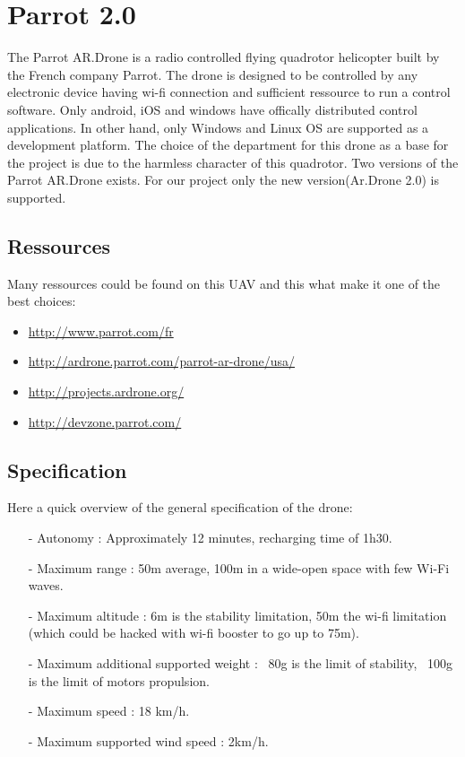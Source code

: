 \section{Parrot 2.0}
The Parrot AR.Drone is a radio controlled flying quadrotor helicopter built by the French company Parrot. The drone is designed to be
controlled by any electronic device having wi-fi connection and sufficient ressource to run a control software. Only  android, iOS and windows have offically distributed control applications. In other hand, only Windows and Linux OS are supported as a development platform.
The choice of the department for this drone as a base for the project is due to the harmless character of this quadrotor.
Two versions of the Parrot AR.Drone exists. For our project only the new version(Ar.Drone 2.0) is supported.
\subsection{Ressources}
Many ressources could be found on this UAV and this what make it one of the best choices:
\begin{itemize}
\item \url{http://www.parrot.com/fr}
\item \url{http://ardrone.parrot.com/parrot-ar-drone/usa/}
\item \url{http://projects.ardrone.org/}
\item \url{http://devzone.parrot.com/}
\end{itemize}
\subsection{Specification}
Here a quick overview of the general specification of the drone:
\begin{itemize}
\item[-] Autonomy : Approximately 12 minutes, recharging time of 1h30.
\item[-] Maximum range : 50m average, 100m in a wide-open space with few Wi-Fi waves.
\item[-] Maximum altitude : 6m is the stability limitation, 50m the wi-fi limitation (which could be hacked with wi-fi booster to go up to 75m).
\item[-] Maximum additional supported weight : ~80g is the limit of stability, ~100g is the limit of motors propulsion.
\item[-] Maximum speed : 18 km/h.
\item[-] Maximum supported wind speed : 2km/h.

\end{itemize}

